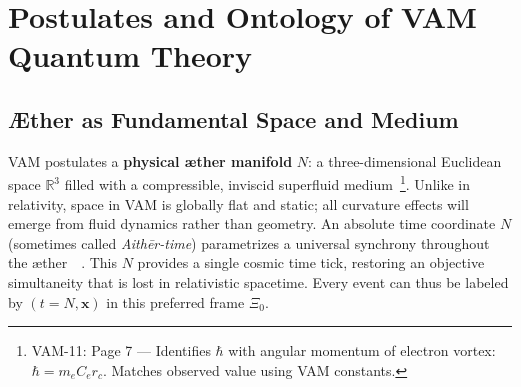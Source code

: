 \documentclass[a4paper,12pt]{article}
\begin{document}
\section{Postulates and Ontology of VAM Quantum Theory}
    \subsection{Æther as Fundamental Space and Medium}
    VAM postulates a \textbf{physical æther manifold} $N$: a three-dimensional Euclidean space $\mathbb{R}^3$ filled with a compressible, inviscid superfluid medium~\footnote{VAM-11: Page 7 — Identifies $\hbar$ with angular momentum of electron vortex: $\hbar = m_e C_e r_c$. Matches observed value using VAM constants.}. Unlike in relativity, space in VAM is globally flat and static; all curvature effects will emerge from fluid dynamics rather than geometry. An absolute time coordinate $N$ (sometimes called \emph{Aithēr-time}) parametrizes a universal synchrony throughout the æther~~\cite{reference_15,reference_16}. This $N$ provides a single cosmic time tick, restoring an objective simultaneity that is lost in relativistic spacetime. Every event can thus be labeled by $(t=N, \mathbf{x})$ in this preferred frame $\Xi_0$.
\end{document}
